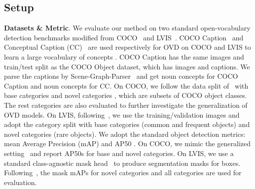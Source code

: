\documentclass[10pt,twocolumn,letterpaper]{article}
\begin{document}
\subsection{Setup}
\textbf{Datasets \& Metric}.
We evaluate our method on two standard open-vocabulary detection benchmarks modified from COCO~\cite{mscoco} and LVIS~\cite{lvis}. COCO Caption~\cite{cococaption} and Conceptual Caption (CC)~\cite{CC3M} are used respectively for OVD on COCO and LVIS to learn a large vocabulary of concepts .
COCO Caption has the same images and train/test split as the COCO Object dataset, which has  images and  captions.
We parse the captions by Scene-Graph-Parser~\cite{schuster2015scenegraph} and get  noun concepts for COCO Caption and  noun concepts for CC. 
On COCO, we follow the data split of~\cite{ovrcnn} with  base categories  and  novel categories , which are subsets of  COCO object classes. The rest  categories  are also evaluated to further investigate the generalization of OVD models. On LVIS, following~\cite{vild}, we use the training/validation images and adopt the category split with  base categories (common and frequent objects) and  novel categories (rare objects). 
We adopt the standard object detection metrics: mean Average Precision (mAP) and AP50
. On COCO, we mimic the generalized setting~\cite{vscoco_zeroshot} and report AP50s for base and novel categories.
On LVIS, we use a standard class-agnostic mask head~\cite{MaskRCNN} to produce segmentation masks for boxes. Following~\cite{detic}, the mask mAPs for novel categories and all categories are used for evaluation.
\end{document}

